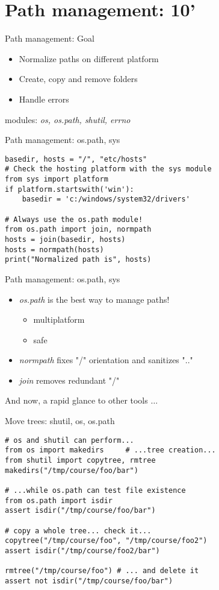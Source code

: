\section{Path management: 10'}

\begin{frame}[fragile]{Path management: Goal}
\Large
\begin{itemize}
\item Normalize paths on different platform
\item Create, copy and remove folders
\item Handle errors
\end{itemize}
modules: \emph{os, os.path, shutil, errno}
\end{frame}

\begin{frame}[fragile]{Path management: os.path, sys}
\begin{verbatim}
basedir, hosts = "/", "etc/hosts"
# Check the hosting platform with the sys module
from sys import platform
if platform.startswith('win'):
    basedir = 'c:/windows/system32/drivers'

# Always use the os.path module!
from os.path import join, normpath 
hosts = join(basedir, hosts)
hosts = normpath(hosts)
print("Normalized path is", hosts)
\end{verbatim}
\end{frame}

\begin{frame}[fragile]{Path management: os.path, sys}
\Large
\begin{itemize}
\item \emph{os.path} is the best way to manage paths!
\begin{itemize}
 \Large
 \item multiplatform
 \item safe
 \end{itemize}
 
\item \emph{normpath} fixes "/" orientation and sanitizes ".."
\item \emph{join} removes redundant "/"
\end{itemize}
And now, a rapid glance to other tools $\ldots$
\end{frame}

\begin{frame}[fragile]{Move trees: shutil, os, os.path}
\begin{verbatim}
# os and shutil can perform...
from os import makedirs     # ...tree creation...
from shutil import copytree, rmtree 
makedirs("/tmp/course/foo/bar")

# ...while os.path can test file existence
from os.path import isdir            
assert isdir("/tmp/course/foo/bar")

# copy a whole tree... check it...
copytree("/tmp/course/foo", "/tmp/course/foo2") 
assert isdir("/tmp/course/foo2/bar")            

rmtree("/tmp/course/foo") # ... and delete it
assert not isdir("/tmp/course/foo/bar")
\end{verbatim}
\end{frame}

